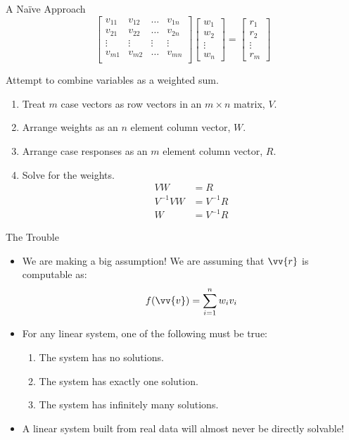 \documentclass[handout]{beamer}
\begin{document}
\begin{frame}{A Na\"ive Approach}
    \[
    \left[
    \begin{array}{cccc}
    v_{11} & v_{12} & \ldots & v_{1n} \\
    v_{21} & v_{22} & \ldots & v_{2n} \\
    \vdots & \vdots & \vdots & \vdots \\
    v_{m1} & v_{m2} & \ldots & v_{mn} \\
    \end{array}
    \right]
    \left[
    \begin{array}{c} 
        w_1 \\
        w_2 \\
        \vdots \\
        w_n
    \end{array}
    \right] =
    \left[
    \begin{array}{c} 
        r_1 \\
        r_2 \\
        \vdots \\
        r_m
    \end{array}
    \right]
    \]
    
    Attempt to combine variables as a weighted sum.
    \begin{enumerate}
        \item Treat $m$ case vectors as row vectors in an $m \times n$ matrix, $V$.
        \item Arrange weights as an $n$ element column vector, $W$.
        \item Arrange case responses as an $m$ element column vector, $R$.
        \item Solve for the weights.
        \begin{align*}
            VW &= R \\
            V^{-1}VW &= V^{-1}R \\
            W &= V^{-1}R
        \end{align*}
    \end{enumerate}
\end{frame}

\begin{frame}{The Trouble}
    \begin{itemize}
        \item We are making a big assumption! We are assuming that $\vv{r}$ is computable as:
        \[
        f(\vv{v}) = \sum_{i=1}^n w_i v_i
        \]
        \item For any linear system, one of the following must be true:
        \begin{enumerate}
            \item The system has no solutions.
            \item The system has exactly one solution.
            \item The system has infinitely many solutions.
        \end{enumerate}
        \item A linear system built from real data will almost never be directly solvable!
    \end{itemize}
\end{frame}
\end{document}
